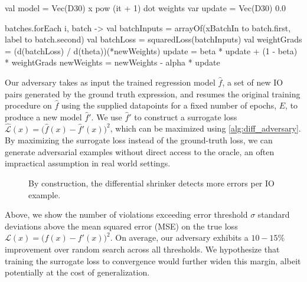 \begin{kotlinlisting}
val model = Vec(D30) { x pow (it + 1) } dot weights
var update = Vec(D30) { 0.0 }

batches.forEach { i, batch ->
  val batchInputs = arrayOf(xBatchIn to batch.first, label to batch.second)
  val batchLoss = squaredLoss(batchInputs)
  val weightGrads = (d(batchLoss) / d(theta))(*newWeights)
  update = beta * update + (1 - beta) * weightGrads
  newWeights = newWeights - alpha * update
}
\end{kotlinlisting}

Our adversary takes as input the trained regression model $\hat{f}$, a set of new IO pairs generated by the ground truth expression, and resumes the original training procedure on $\hat{f}$ using the supplied datapoints for a fixed number of epochs, $E$, to produce a new model $\hat{f}'$. We use $\hat{f}'$ to construct a surrogate loss $\hat{\mathcal{L}}(x) = \big(\hat{f}(x) - \hat{f}'(x)\big)^2$, which can be maximized using \autoref{alg:diff_adversary}. By maximizing the surrogate loss instead of the ground-truth loss, we can generate adversarial examples without direct access to the oracle, an often impractical assumption in real world settings.

\begin{figure}[H]
\caption{By construction, the differential shrinker detects more errors per IO example.}
\label{fig:pbt_comparison}
\end{figure}

Above, we show the number of violations exceeding error threshold $\sigma$ standard deviations above the mean squared error (MSE) on the true loss $\mathcal{L}(x) = \big(f(x) - f'(x)\big)^2$. On average, our adversary exhibits a $10-15\%$ improvement over random search across all thresholds. We hypothesize that training the surrogate loss to convergence would further widen this margin, albeit potentially at the cost of generalization.

